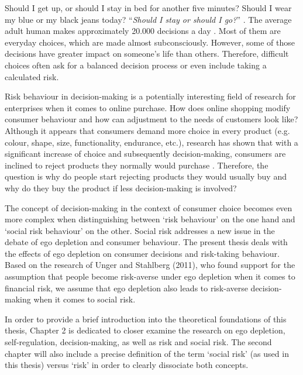 \onehalfspacing
Should I get up, or should I stay in bed for another five minutes? Should I wear my blue or my black jeans today? “\emph{Should I stay or should I go?}” \citep{theclash}. The average adult human makes approximately 20.000 decisions a day \citep{toennemann2008}. Most of them are everyday choices, which are made almost subconsciously. However, some of those decisions have greater impact on someone’s life than others. Therefore, difficult choices often ask for a balanced decision process or even include taking a calculated risk.\par
Risk behaviour in decision-making is a potentially interesting field of research for enterprises \citep{baumeister2002yielding} when it comes to online purchase. How does online shopping modify consumer behaviour and how can adjustment to the needs of customers look like? Although it appears that consumers demand more choice in every product (e.g. colour, shape, size, functionality, endurance, etc.), research has shown that with a significant increase of choice and subsequently decision-making, consumers are inclined to reject products they normally would purchase \citep{greifeneder2010less,levav2010order}. Therefore, the question is why do people start rejecting products they would usually buy and why do they buy the product if less decision-making is involved?\par
The concept of decision-making in the context of consumer choice becomes even more complex when distinguishing between ‘risk behaviour’ on the one hand and ‘social risk behaviour’ on the other. Social risk addresses a new issue in the debate of ego depletion and consumer behaviour. The present thesis deals with the effects of ego depletion on consumer decisions and risk-taking behaviour. Based on the research of Unger and Stahlberg (2011), who found support for the assumption that people become risk-averse under ego depletion when it comes to financial risk, we assume that ego depletion also leads to risk-averse decision-making when it comes to social risk.\par
In order to provide a brief introduction into the theoretical foundations of this thesis, Chapter 2 is dedicated to closer examine the research on ego depletion, self-regulation, decision-making, as well as risk and social risk. The second chapter will also include a precise definition of the term ‘social risk’ (as used in this thesis) versus ‘risk’ in order to clearly dissociate both concepts. \par
